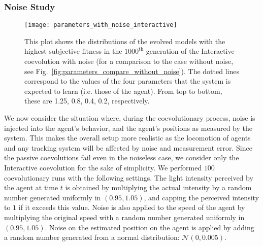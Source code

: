 \subsubsection{Noise Study}\label{sec:noise_study_interaction}

\begin{figure}[!t]
		\centering
		\texttt{[image: parameters\_with\_noise\_interactive]}
		\caption{This plot shows the distributions of the evolved models with the highest subjective fitness in the $1000^\textrm{th}$ generation of the Interactive coevolution with noise (for a comparison to the case without noise, see Fig.~\ref{fig:parameters_compare_without_noise}). The dotted lines correspond to the values of the four parameters that the system is expected to learn (i.e. those of the agent). From top to bottom, these are 1.25, 0.8, 0.4, 0.2, respectively. \label{fig:parameters_compare_with_noise}}
\end{figure}


We now consider the situation where, during the coevolutionary process, noise is injected into the agent's behavior, and the agent's positions as measured by the system. This makes the overall setup more realistic as the locomotion of agents and any tracking system will be affected by noise and measurement error. Since the passive coevolutions fail even in the noiseless case, we consider only the Interactive coevolution for the sake of simplicity. We performed $100$ coevolutionary runs with the following settings. The light intensity perceived by the agent at time $t$ is obtained by multiplying the actual intensity by a random number generated uniformly in $\left(0.95,1.05\right)$, and capping the perceived intensity to $1$ if it exceeds this value. Noise is also applied to the speed of the agent by multiplying the original speed with a random number generated uniformly in $\left(0.95,1.05\right)$. Noise on the estimated position on the agent is applied by adding a random number generated from a normal distribution: $\mathcal{N}\left(0,0.005\right)$. 

